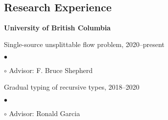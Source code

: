 \documentclass[margin,line]{res}
\newenvironment{list1}{
  \begin{list}{\ding{113}}{%
      \setlength{\itemsep}{0in}
      \setlength{\parsep}{0.025in} \setlength{\parskip}{0in}
      \setlength{\topsep}{0in} \setlength{\partopsep}{0in}
      \setlength{\leftmargin}{0.17in}}}{\end{list}}
\newenvironment{list2}{
  \begin{list}{$\bullet$}{%
      \setlength{\itemsep}{0in}
      \setlength{\parsep}{0in} \setlength{\parskip}{0in}
      \setlength{\topsep}{0in} \setlength{\partopsep}{0in}
      \setlength{\leftmargin}{0.2in}}}{\end{list}}
\begin{document}
\begin{resume}












\section{\sc Research Experience}

{\bf University of British Columbia}\\
\vspace*{-.1in}
\begin{list1}
\item[] Single-source unsplittable flow problem, 2020--present
  \begin{list2}
  \item[$\circ$] Advisor: F. Bruce Shepherd
  \end{list2}
\item[] Gradual typing of recursive types, 2018--2020
  \begin{list2}
  \item[$\circ$] Advisor: Ronald Garcia
  \end{list2}
\end{list1}



\end{resume}
\end{document}

